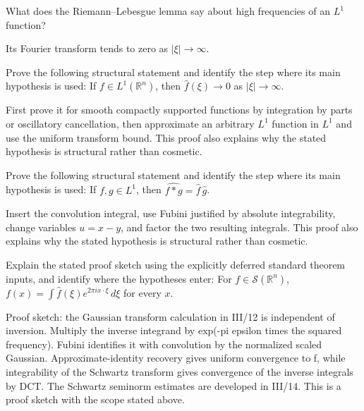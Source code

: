 \begin{problem}\label{prob:iii11-problem-08}
What does the Riemann--Lebesgue lemma say about high frequencies of an \(L^1\) function?
\end{problem}
\begin{solution}
Its Fourier transform tends to zero as \(|\xi|\to\infty\).
\end{solution}

\begin{problem}\label{prob:iii11-problem-09}
Prove the following structural statement and identify the step where its main hypothesis is used: If $f\in L^1(\mathbb R^n)$, then $\widehat f(\xi)\to0$ as $|\xi|\to\infty$.
\end{problem}
\begin{solution}
First prove it for smooth compactly supported functions by integration by parts or oscillatory cancellation, then approximate an arbitrary $L^1$ function in $L^1$ and use the uniform transform bound. This proof also explains why the stated hypothesis is structural rather than cosmetic.
\end{solution}

\begin{problem}\label{prob:iii11-problem-10}
Prove the following structural statement and identify the step where its main hypothesis is used: If $f,g\in L^1$, then $\widehat{f*g}=\widehat f\,\widehat g$.
\end{problem}
\begin{solution}
Insert the convolution integral, use Fubini justified by absolute integrability, change variables $u=x-y$, and factor the two resulting integrals. This proof also explains why the stated hypothesis is structural rather than cosmetic.
\end{solution}

\begin{problem}\label{prob:iii11-problem-11}
Explain the stated proof sketch using the explicitly deferred standard theorem inputs, and identify where the hypotheses enter: For $f\in\mathcal S(\mathbb R^n)$, $f(x)=\int\widehat f(\xi)e^{2\pi ix\cdot\xi}\,d\xi$ for every $x$.
\end{problem}
\begin{solution}
Proof sketch: the Gaussian transform calculation in III/12 is independent of inversion. Multiply the inverse integrand by exp(-pi epsilon times the squared frequency). Fubini identifies it with convolution by the normalized scaled Gaussian. Approximate-identity recovery gives uniform convergence to f, while integrability of the Schwartz transform gives convergence of the inverse integrals by DCT. The Schwartz seminorm estimates are developed in III/14. This is a proof sketch with the scope stated above.
\end{solution}

